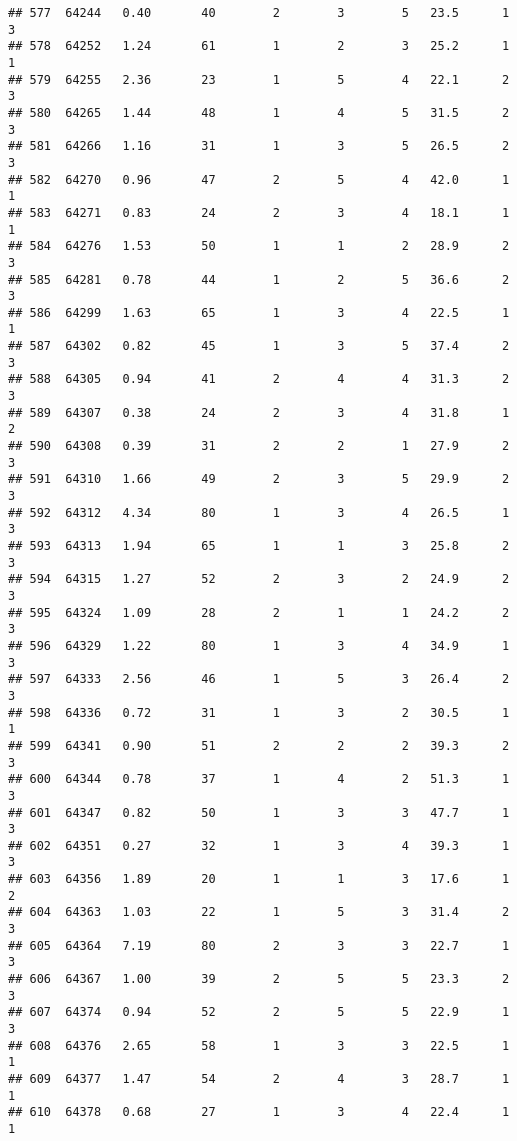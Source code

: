 \documentclass[
]{article}
\begin{document}
\begin{verbatim}
## 577  64244   0.40       40        2        3        5   23.5      1      3
## 578  64252   1.24       61        1        2        3   25.2      1      1
## 579  64255   2.36       23        1        5        4   22.1      2      3
## 580  64265   1.44       48        1        4        5   31.5      2      3
## 581  64266   1.16       31        1        3        5   26.5      2      3
## 582  64270   0.96       47        2        5        4   42.0      1      1
## 583  64271   0.83       24        2        3        4   18.1      1      1
## 584  64276   1.53       50        1        1        2   28.9      2      3
## 585  64281   0.78       44        1        2        5   36.6      2      3
## 586  64299   1.63       65        1        3        4   22.5      1      1
## 587  64302   0.82       45        1        3        5   37.4      2      3
## 588  64305   0.94       41        2        4        4   31.3      2      3
## 589  64307   0.38       24        2        3        4   31.8      1      2
## 590  64308   0.39       31        2        2        1   27.9      2      3
## 591  64310   1.66       49        2        3        5   29.9      2      3
## 592  64312   4.34       80        1        3        4   26.5      1      3
## 593  64313   1.94       65        1        1        3   25.8      2      3
## 594  64315   1.27       52        2        3        2   24.9      2      3
## 595  64324   1.09       28        2        1        1   24.2      2      3
## 596  64329   1.22       80        1        3        4   34.9      1      3
## 597  64333   2.56       46        1        5        3   26.4      2      3
## 598  64336   0.72       31        1        3        2   30.5      1      1
## 599  64341   0.90       51        2        2        2   39.3      2      3
## 600  64344   0.78       37        1        4        2   51.3      1      3
## 601  64347   0.82       50        1        3        3   47.7      1      3
## 602  64351   0.27       32        1        3        4   39.3      1      3
## 603  64356   1.89       20        1        1        3   17.6      1      2
## 604  64363   1.03       22        1        5        3   31.4      2      3
## 605  64364   7.19       80        2        3        3   22.7      1      3
## 606  64367   1.00       39        2        5        5   23.3      2      3
## 607  64374   0.94       52        2        5        5   22.9      1      3
## 608  64376   2.65       58        1        3        3   22.5      1      1
## 609  64377   1.47       54        2        4        3   28.7      1      1
## 610  64378   0.68       27        1        3        4   22.4      1      1

\end{verbatim}
\end{document}
